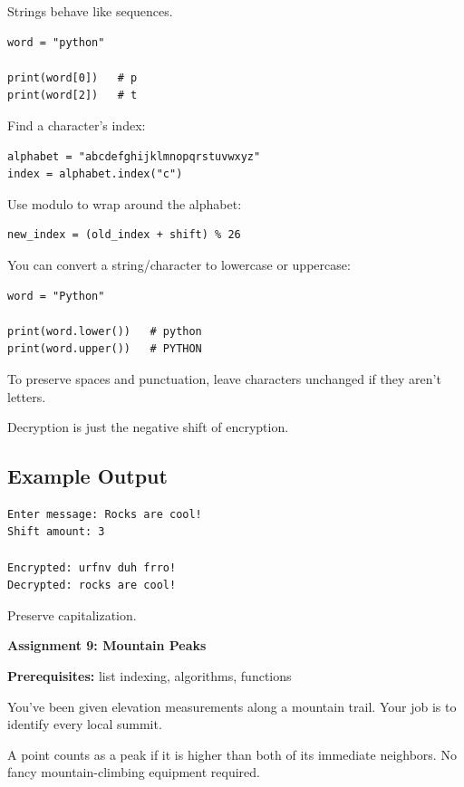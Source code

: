 \documentclass[11pt,letterpaper]{article}
\newcommand{\assignment}[3]{
    \clearpage
    {\Large\bfseries\color{navy} Assignment #1: #2}

    \vspace{2mm}
    {\small\color{darkgray}\textbf{Prerequisites:} #3}

    \vspace{3mm}
}
\newcommand{\exampleoutput}{\subsection*{Example Output}}
\begin{document}
\begin{hintbox}
Strings behave like sequences.

\begin{lstlisting}
word = "python"

print(word[0])   # p
print(word[2])   # t
\end{lstlisting}

Find a character's index:

\begin{lstlisting}
alphabet = "abcdefghijklmnopqrstuvwxyz"
index = alphabet.index("c")
\end{lstlisting}

Use modulo to wrap around the alphabet:

\begin{lstlisting}
new_index = (old_index + shift) % 26
\end{lstlisting}

You can convert a string/character to lowercase or uppercase:
\begin{lstlisting}
word = "Python"

print(word.lower())   # python
print(word.upper())   # PYTHON
\end{lstlisting}

To preserve spaces and punctuation, leave characters unchanged if they aren't letters.

Decryption is just the negative shift of encryption.
\end{hintbox}

\exampleoutput

\begin{lstlisting}[style=outputstyle]
Enter message: Rocks are cool!
Shift amount: 3

Encrypted: urfnv duh frro!
Decrypted: rocks are cool!
\end{lstlisting}

\begin{challengebox}
Preserve capitalization.
\end{challengebox}

\assignment{9}{Mountain Peaks}
{list indexing, algorithms, functions}

\begin{missionbox}
You've been given elevation measurements along a mountain trail. Your job is to identify every local summit.

A point counts as a peak if it is higher than both of its immediate neighbors. No fancy mountain-climbing equipment required.
\end{missionbox}
\end{document}
